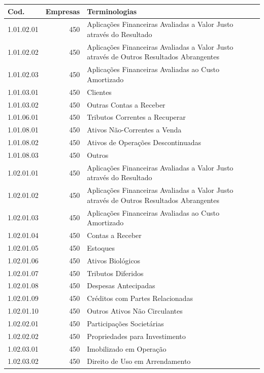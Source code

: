 \begin{table}[ht]
\centering
\begin{tabular}{lrl}
  \hline
Cod. & Empresas & Terminologias \\ 
  \hline
1.01.02.01 & 450 & Aplicações Financeiras Avaliadas a Valor Justo através do Resultado \\ 
  1.01.02.02 & 450 & Aplicações Financeiras Avaliadas a Valor Justo através de Outros Resultados Abrangentes \\ 
  1.01.02.03 & 450 & Aplicações Financeiras Avaliadas ao Custo Amortizado \\ 
  1.01.03.01 & 450 & Clientes \\ 
  1.01.03.02 & 450 & Outras Contas a Receber \\ 
  1.01.06.01 & 450 & Tributos Correntes a Recuperar \\ 
  1.01.08.01 & 450 & Ativos Não-Correntes a Venda \\ 
  1.01.08.02 & 450 & Ativos de Operações Descontinuadas \\ 
  1.01.08.03 & 450 & Outros \\ 
  1.02.01.01 & 450 & Aplicações Financeiras Avaliadas a Valor Justo através do Resultado \\ 
  1.02.01.02 & 450 & Aplicações Financeiras Avaliadas a Valor Justo através de Outros Resultados Abrangentes \\ 
  1.02.01.03 & 450 & Aplicações Financeiras Avaliadas ao Custo Amortizado \\ 
  1.02.01.04 & 450 & Contas a Receber \\ 
  1.02.01.05 & 450 & Estoques \\ 
  1.02.01.06 & 450 & Ativos Biológicos \\ 
  1.02.01.07 & 450 & Tributos Diferidos \\ 
  1.02.01.08 & 450 & Despesas Antecipadas \\ 
  1.02.01.09 & 450 & Créditos com Partes Relacionadas \\ 
  1.02.01.10 & 450 & Outros Ativos Não Circulantes \\ 
  1.02.02.01 & 450 & Participações Societárias \\ 
  1.02.02.02 & 450 & Propriedades para Investimento \\ 
  1.02.03.01 & 450 & Imobilizado em Operação \\ 
  1.02.03.02 & 450 & Direito de Uso em Arrendamento \\ 

\end{tabular}
\end{table}
